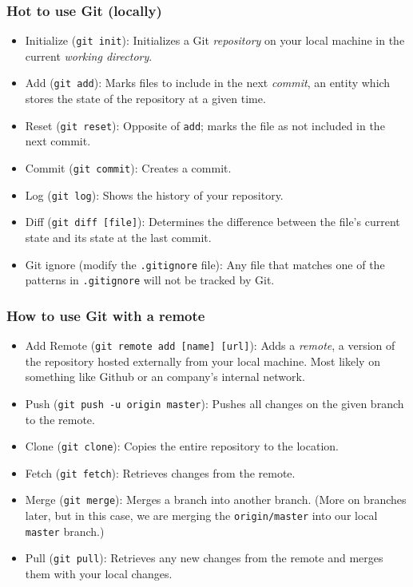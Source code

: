 \documentclass{lug}
\begin{document}
\begin{frame}
    \frametitle{Hot to use Git (locally)}

    \begin{itemize}
        \item Initialize (\texttt{git init}): Initializes a Git \textit{repository} on your local
            machine in the current \textit{working directory}.
        \item Add (\texttt{git add}): Marks files to include in the next \textit{commit}, an entity
            which stores the state of the repository at a given time.
        \item Reset (\texttt{git reset}): Opposite of \texttt{add}; marks the file as not included
            in the next commit.
        \item Commit (\texttt{git commit}): Creates a commit.
        \item Log (\texttt{git log}): Shows the history of your repository.
        \item Diff (\texttt{git diff [file]}): Determines the difference between the file's current
            state and its state at the last commit.
        \item Git ignore (modify the \texttt{.gitignore} file): Any file that matches one of the
            patterns in \texttt{.gitignore} will not be tracked by Git.
    \end{itemize}
\end{frame}

\begin{frame}
    \frametitle{How to use Git with a remote}

    \begin{itemize}
        \item Add Remote (\texttt{git remote add [name] [url]}): Adds a \textit{remote}, a version
            of the repository hosted externally from your local machine. Most likely on something
            like Github or an company's internal network.
        \item Push (\texttt{git push -u origin master}): Pushes all changes on the given branch
            to the remote.
        \item Clone (\texttt{git clone}): Copies the entire repository to the location.
        \item Fetch (\texttt{git fetch}): Retrieves changes from the remote.
        \item Merge (\texttt{git merge}): Merges a branch into another branch. (More on branches
            later, but in this case, we are merging the \texttt{origin/master} into our local
            \texttt{master} branch.)
        \item Pull (\texttt{git pull}): Retrieves any new changes from the remote and merges them
            with your local changes.
    \end{itemize}
\end{frame}
\end{document}
